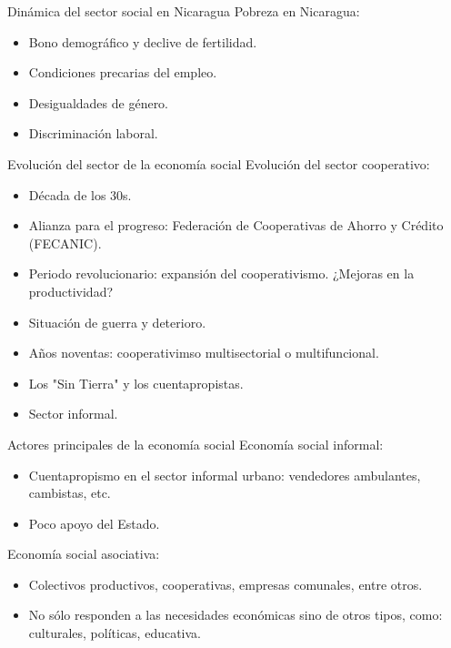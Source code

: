 \documentclass[11pt, aspectratio=169, compress]{beamer}
\begin{document}
\begin{frame}{Dinámica del sector social en Nicaragua}
	Pobreza en Nicaragua:
	\begin{itemize}
		\item Bono demográfico y declive de fertilidad.
		\item Condiciones precarias del empleo.
		\item Desigualdades de género. 
		\item Discriminación laboral. 
	\end{itemize}
\end{frame}
\begin{frame}{Evolución del sector de la economía social}
	Evolución del sector cooperativo: 
	\begin{itemize}
		\item Década de los 30s. 
		\item Alianza para el progreso: Federación de Cooperativas de Ahorro y Crédito (FECANIC). 
		\item Periodo revolucionario: expansión del cooperativismo. ¿Mejoras en la productividad? 
		\item Situación de guerra y deterioro. 
		\item Años noventas: cooperativimso multisectorial o multifuncional. 
		\item Los "Sin Tierra" y los cuentapropistas.
		\item Sector informal.
	\end{itemize}
\end{frame}
\begin{frame}{Actores principales de la economía social}
	Economía social informal: 
	\begin{itemize}
		\item Cuentapropismo en el sector informal urbano: vendedores ambulantes, cambistas, etc.
		\item Poco apoyo del Estado.
	\end{itemize}
	Economía social asociativa:
	\begin{itemize}
		\item Colectivos productivos, cooperativas, empresas comunales, entre otros. 
		\item No sólo responden a las necesidades económicas sino de otros tipos, como: culturales, políticas, educativa.
	\end{itemize}
\end{frame}
\end{document}
